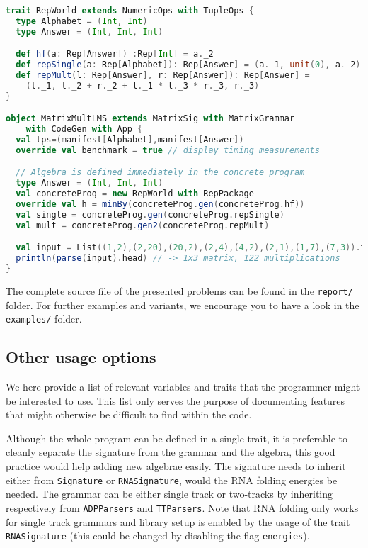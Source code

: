 \begin{lstlisting}[language=Scala]
trait RepWorld extends NumericOps with TupleOps {
  type Alphabet = (Int, Int)
  type Answer = (Int, Int, Int)

  def hf(a: Rep[Answer]) :Rep[Int] = a._2
  def repSingle(a: Rep[Alphabet]): Rep[Answer] = (a._1, unit(0), a._2)
  def repMult(l: Rep[Answer], r: Rep[Answer]): Rep[Answer] =
    (l._1, l._2 + r._2 + l._1 * l._3 * r._3, r._3)
}

object MatrixMultLMS extends MatrixSig with MatrixGrammar
    with CodeGen with App {
  val tps=(manifest[Alphabet],manifest[Answer])
  override val benchmark = true // display timing measurements

  // Algebra is defined immediately in the concrete program
  type Answer = (Int, Int, Int)
  val concreteProg = new RepWorld with RepPackage
  override val h = minBy(concreteProg.gen(concreteProg.hf))
  val single = concreteProg.gen(concreteProg.repSingle)
  val mult = concreteProg.gen2(concreteProg.repMult)

  val input = List((1,2),(2,20),(20,2),(2,4),(4,2),(2,1),(1,7),(7,3)).toArray
  println(parse(input).head) // -> 1x3 matrix, 122 multiplications
}
\end{lstlisting}

The complete source file of the presented problems can be found in the {\tt report/} folder. For further examples and variants, we encourage you to have a look in the {\tt examples/} folder.

\newpage
\subsection{Other usage options}
We here provide a list of relevant variables and traits that the programmer might be interested to use. This list only serves the purpose of documenting features that might otherwise be difficult to find within the code.

Although the whole program can be defined in a single trait, it is preferable to cleanly separate the signature from the grammar and the algebra, this good practice would help adding new algebrae easily. The signature needs to inherit either from {\tt Signature} or {\tt RNASignature}, would the RNA folding energies be needed. The grammar can be either single track or two-tracks by inheriting respectively from  {\tt ADPParsers} and {\tt TTParsers}. Note that RNA folding only works for single track grammars and library setup is enabled by the usage of the trait {\tt RNASignature} (this could be changed by disabling the flag {\tt energies}).

